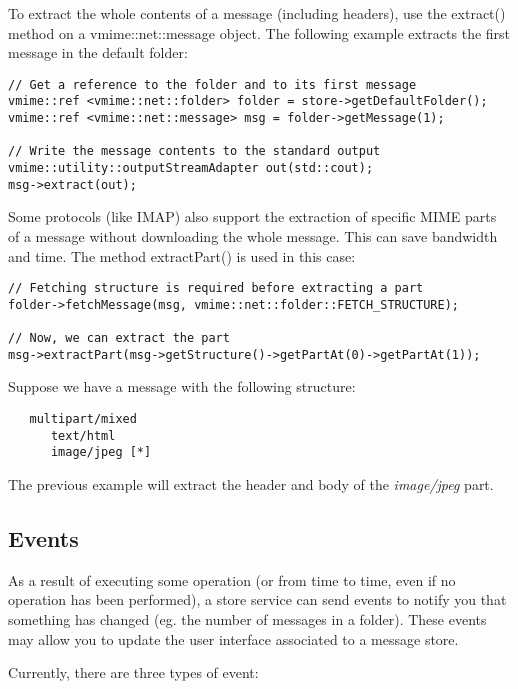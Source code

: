 To extract the whole contents of a message (including headers), use the
{\vcode extract()} method on a {\vcode vmime::net::message} object. The
following example extracts the first message in the default folder:

\begin{lstlisting}[caption={Extracting messages}]
// Get a reference to the folder and to its first message
vmime::ref <vmime::net::folder> folder = store->getDefaultFolder();
vmime::ref <vmime::net::message> msg = folder->getMessage(1);

// Write the message contents to the standard output
vmime::utility::outputStreamAdapter out(std::cout);
msg->extract(out);
\end{lstlisting}

Some protocols (like IMAP) also support the extraction of specific MIME parts
of a message without downloading the whole message. This can save bandwidth
and time. The method {\vcode extractPart()} is used in this case:

\begin{lstlisting}[caption={Extracting a specific MIME part of a message}]
// Fetching structure is required before extracting a part
folder->fetchMessage(msg, vmime::net::folder::FETCH_STRUCTURE);

// Now, we can extract the part
msg->extractPart(msg->getStructure()->getPartAt(0)->getPartAt(1));
\end{lstlisting}

Suppose we have a message with the following structure:

\begin{verbatim}
   multipart/mixed
      text/html
      image/jpeg [*]
\end{verbatim}

The previous example will extract the header and body of the \emph{image/jpeg}
part.

\subsection{Events} %

As a result of executing some operation (or from time to time, even if no
operation has been performed), a store service can send events to notify you
that something has changed (eg. the number of messages in a folder). These
events may allow you to update the user interface associated to a message
store.

Currently, there are three types of event:

